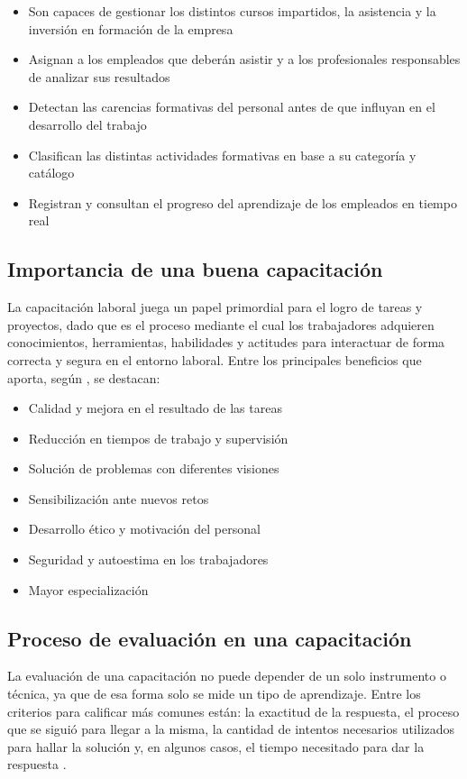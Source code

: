 \begin{itemize}
\item Son capaces de gestionar los distintos cursos impartidos, la asistencia y la inversión en formación de la empresa
\item Asignan a los empleados que deberán asistir y a los profesionales responsables de analizar sus resultados
\item Detectan las carencias formativas del personal antes de que influyan en el desarrollo del trabajo
\item Clasifican las distintas actividades formativas en base a su categoría y catálogo
\item Registran y consultan el progreso del aprendizaje de los empleados en tiempo real
\end{itemize}

\subsection{Importancia de una buena capacitación}
La capacitación laboral juega un papel primordial para el logro de tareas y proyectos, dado que es el proceso mediante el cual los trabajadores adquieren conocimientos, herramientas, habilidades y actitudes para interactuar de forma correcta y segura en el entorno laboral. Entre los principales beneficios que aporta, según \cite{RogelioE.Martinez2002}, se destacan:

\begin{itemize}
\item Calidad y mejora en el resultado de las tareas
\item Reducción en tiempos de trabajo y supervisión
\item Solución de problemas con diferentes visiones
\item Sensibilización ante nuevos retos
\item Desarrollo ético y motivación del personal
\item Seguridad y autoestima en los trabajadores
\item Mayor especialización
\end{itemize}

\subsection{Proceso de evaluación en una capacitación}
La evaluación de una capacitación no puede depender de un solo instrumento o técnica, ya que de esa forma solo se mide un tipo de aprendizaje. Entre los criterios para calificar más comunes están: la exactitud de la respuesta, el proceso que se siguió para llegar a la misma, la cantidad de intentos necesarios utilizados para hallar la solución y, en algunos casos, el tiempo necesitado para dar la respuesta \cite{Jacobs2012}.

